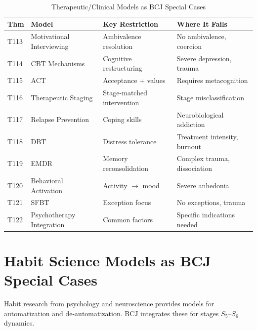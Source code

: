 \begin{table}[htbp]
\centering
\caption{Therapeutic/Clinical Models as BCJ Special Cases}
\label{tab:therapeutic-boundaries}
\renewcommand{\arraystretch}{1.2}
\begin{tabular}{@{}llp{3.5cm}p{4cm}@{}}
\toprule
\textbf{Thm} & \textbf{Model} & \textbf{Key Restriction} & \textbf{Where It Fails} \\
\midrule
T113 & Motivational Interviewing & Ambivalence resolution & No ambivalence, coercion \\
T114 & CBT Mechanisms & Cognitive restructuring & Severe depression, trauma \\
T115 & ACT & Acceptance + values & Requires metacognition \\
T116 & Therapeutic Staging & Stage-matched intervention & Stage misclassification \\
T117 & Relapse Prevention & Coping skills & Neurobiological addiction \\
T118 & DBT & Distress tolerance & Treatment intensity, burnout \\
T119 & EMDR & Memory reconsolidation & Complex trauma, dissociation \\
T120 & Behavioral Activation & Activity $\to$ mood & Severe anhedonia \\
T121 & SFBT & Exception focus & No exceptions, trauma \\
T122 & Psychotherapy Integration & Common factors & Specific indications needed \\
\bottomrule
\end{tabular}
\end{table}



\section{Habit Science Models as BCJ Special Cases}
\label{sec:habit-science}

Habit research from psychology and neuroscience provides models for automatization and de-automatization. BCJ integrates these for stages $S_5$--$S_6$ dynamics.


